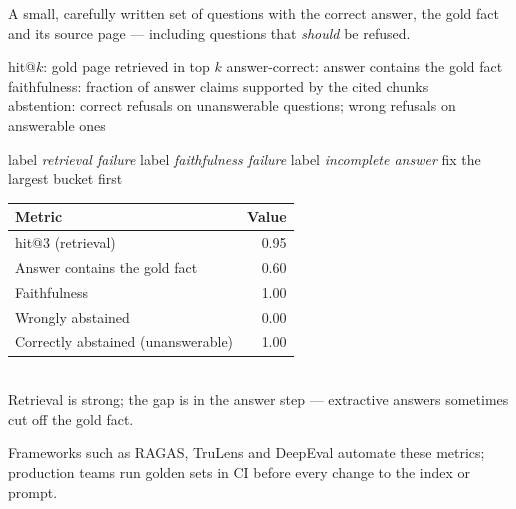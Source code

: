 \documentclass[11pt,a4paper]{article}
\begin{document}

\begin{bdef}
A small, carefully written set of questions with the correct answer, the gold fact and its source page --- including questions that \emph{should} be refused.
\end{bdef}
\begin{bmath}
hit@$k$: gold page retrieved in top $k$ \quad answer-correct: answer contains the gold fact\\
faithfulness: fraction of answer claims supported by the cited chunks\\
abstention: correct refusals on unanswerable questions; wrong refusals on answerable ones
\end{bmath}
\begin{balgo}
\begin{algorithmic}[1]
   \State label \emph{retrieval failure}
   \State label \emph{faithfulness failure}
  \Else \State label \emph{incomplete answer}
  \EndIf
\EndFor
\State fix the largest bucket first
\end{algorithmic}
\end{balgo}
\begin{bres}
\begin{tabular}{lr}
\toprule
Metric & Value\\
\midrule
hit@3 (retrieval) & 0.95\\
Answer contains the gold fact & 0.60\\
Faithfulness & 1.00\\
Wrongly abstained & 0.00\\
Correctly abstained (unanswerable) & 1.00\\
\bottomrule
\end{tabular}\\[3pt]
Retrieval is strong; the gap is in the answer step --- extractive answers sometimes cut off the gold fact.
\end{bres}
\begin{bapp}
Frameworks such as RAGAS, TruLens and DeepEval automate these metrics; production teams run golden sets in CI before every change to the index or prompt.
\end{bapp}
\end{document}
